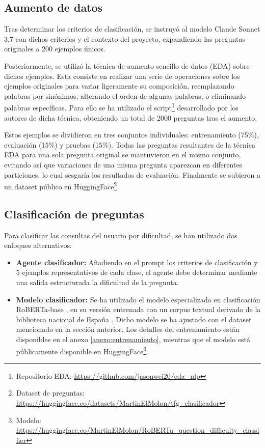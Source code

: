 \subsection{Aumento de datos}
Tras determinar los criterios de clasificación, se instruyó al modelo Claude Sonnet 3.7 con dichos criterios y el contexto del proyecto, expandiendo las preguntas originales a 200 ejemplos únicos.

Posteriormente, se utilizó la técnica de aumento sencillo de datos (EDA) \cite{wei_eda_2019} sobre dichos ejemplos. Esta consiste en realizar una serie de operaciones sobre los ejemplos originales para variar ligeramente su composición, reemplazando palabras por sinónimos, alterando el orden de algunas palabras, o eliminando palabras específicas. Para ello se ha utilizado el script\footnote{Repositorio EDA: \url{https://github.com/jasonwei20/eda_nlp}} desarrollado por los autores de dicha técnica, obteniendo un total de 2000 preguntas tras el aumento.

Estos ejemplos se dividieron en tres conjuntos individuales: entrenamiento (75\%), evaluación (15\%) y pruebas (15\%). Todas las preguntas resultantes de la técnica EDA para una sola pregunta original se mantuvieron en el mismo conjunto, evitando así que variaciones de una misma pregunta aparezcan en diferentes particiones, lo cual sesgaría los resultados de evaluación. Finalmente se subieron a un dataset público en HuggingFace\footnote{Dataset de preguntas: \url{https://huggingface.co/datasets/MartinElMolon/tfg_clasificador}}.

\subsection{Clasificación de preguntas}
Para clasificar las consultas del usuario por dificultad, se han utilizado dos enfoques alternativos:

\begin{itemize}
\item\textbf{Agente clasificador: }Añadiendo en el prompt los criterios de clasificación y 5 ejemplos representativos de cada clase, el agente debe determinar mediante una salida estructurada la dificultad de la pregunta.
\item\textbf{Modelo clasificador: }Se ha utilizado el modelo especializado en clasificación RoBERTa-base \cite{liu_roberta_2019}, en su versión entrenada con un corpus textual derivado de la biblioteca nacional de España \cite{gutierrez-fandino_maria_2021}. Dicho modelo se ha ajustado con el dataset mencionado en la sección anterior. Los detalles del entrenamiento están disponibles en el anexo \ref{anexo:entrenamiento}, mientras que el modelo está públicamente disponible en HuggingFace\footnote{Modelo: \url{https://huggingface.co/MartinElMolon/RoBERTa_question_difficulty_classifier}}.


\end{itemize}
